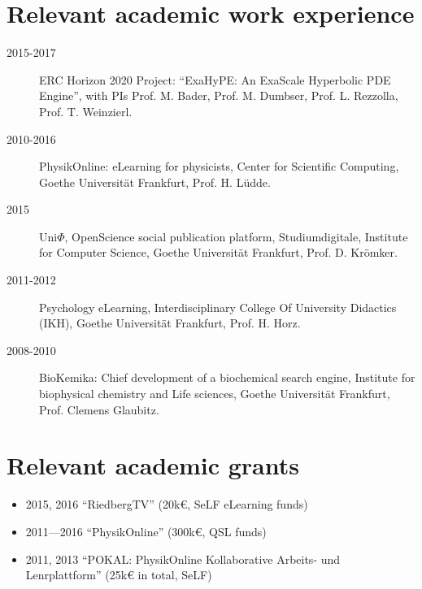 \begin{fullwidth}
\begin{multicols}{2}
\section*{Relevant academic work experience}
\begin{description}
	\item[2015-2017] ERC Horizon 2020 Project: ``ExaHyPE: An ExaScale 
	Hyperbolic PDE Engine'', with PIs Prof. M. Bader, Prof. M. Dumbser, Prof. L. 
	Rezzolla, Prof. T. Weinzierl.
	\item[2010-2016] PhysikOnline: eLearning for physicists, 
	  Center for Scientific Computing, Goethe Universität Frankfurt,
	  Prof. H. Lüdde.
	\item[2015] Uni$\Phi$, OpenScience social publication platform,
	   Studiumdigitale, Institute for Computer Science, Goethe
	   Universität Frankfurt, Prof. D. Krömker.
	\item[2011-2012] Psychology eLearning, Interdisciplinary
	   College Of University Didactics (IKH), Goethe Universität Frankfurt,
       Prof. H. Horz.
    \item[2008-2010] BioKemika: Chief development of a biochemical
       search engine, Institute for biophysical chemistry and Life sciences,
       Goethe Universität Frankfurt, Prof. Clemens Glaubitz.
\end{description}

\section*{Relevant academic grants}
\begin{itemize}
  \item 2015, 2016  ``RiedbergTV'' (20k\euro{}, SeLF eLearning funds)
  \item 2011---2016  ``PhysikOnline'' (300k\euro{}, QSL funds)
  \item 2011, 2013 ``POKAL: PhysikOnline Kollaborative Arbeits- und 
  Lenrplattform'' (25k\euro{} in total, SeLF)
\end{itemize}

\end{multicols}
\end{fullwidth}%
